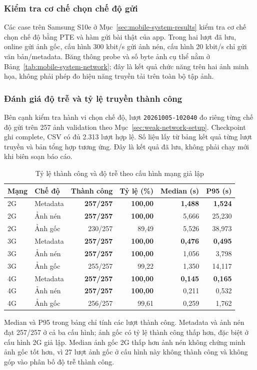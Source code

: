 \subsubsection{Kiểm tra cơ chế chọn chế độ gửi}
Các case trên Samsung S10e ở Mục~\ref{sec:mobile-system-results} kiểm tra cơ chế chọn chế độ bằng PTE và hàm gửi bài thật của app. Trong hai lượt đã lưu, online gửi ảnh gốc, cấu hình 300 kbit/s gửi ảnh nén, cấu hình 20 kbit/s chỉ gửi văn bản/metadata. Băng thông probe và số byte ảnh cụ thể nằm ở Bảng~\ref{tab:mobile-system-network}; đây là kết quả chức năng trên hai ảnh minh họa, không phải phép đo hiệu năng truyền tải trên toàn bộ tập ảnh.

\subsubsection{Đánh giá độ trễ và tỷ lệ truyền thành công}
Bên cạnh kiểm tra hành vi chọn chế độ, lượt \texttt{20261005-102040} đo riêng từng chế độ gửi trên 257 ảnh validation theo Mục~\ref{sec:weak-network-setup}. Checkpoint ghi complete, CSV có đủ 2.313 lượt hợp lệ. Số liệu lấy từ bảng kết quả từng lượt truyền và bản tổng hợp tương ứng. Đây là kết quả đã lưu, không phải chạy mới khi biên soạn báo cáo.

\begin{table}[htbp]\centering
\caption{Tỷ lệ thành công và độ trễ theo cấu hình mạng giả lập}
\label{tab:weak-network-new-results}
\begin{tabular}{llrrrr}
\toprule Mạng & Chế độ & Thành công & Tỷ lệ (\%) & Median (s) & P95 (s) \\
\midrule
2G & Metadata & \textbf{257/257} & \textbf{100,00} & \textbf{1,488} & \textbf{1,524} \\
2G & Ảnh nén & \textbf{257/257} & \textbf{100,00} & 5,666 & 25,230 \\
2G & Ảnh gốc & 230/257 & 89,49 & 5,526 & 38,973 \\
3G & Metadata & \textbf{257/257} & \textbf{100,00} & \textbf{0,476} & \textbf{0,495} \\
3G & Ảnh nén & \textbf{257/257} & \textbf{100,00} & 1,056 & 3,798 \\
3G & Ảnh gốc & 255/257 & 99,22 & 1,350 & 14,117 \\
4G & Metadata & \textbf{257/257} & \textbf{100,00} & \textbf{0,145} & \textbf{0,165} \\
4G & Ảnh nén & \textbf{257/257} & \textbf{100,00} & 0,211 & 0,532 \\
4G & Ảnh gốc & 256/257 & 99,61 & 0,259 & 1,762 \\
\bottomrule
\end{tabular}
\end{table}
Median và P95 trong bảng chỉ tính các lượt thành công. Metadata và ảnh nén đạt 257/257 ở cả ba cấu hình; ảnh gốc có tỷ lệ thành công thấp hơn, đặc biệt ở cấu hình 2G giả lập. Median ảnh gốc 2G thấp hơn ảnh nén không chứng minh ảnh gốc tốt hơn, vì 27 lượt ảnh gốc ở cấu hình này không thành công và không góp vào phân bố độ trễ thành công.

